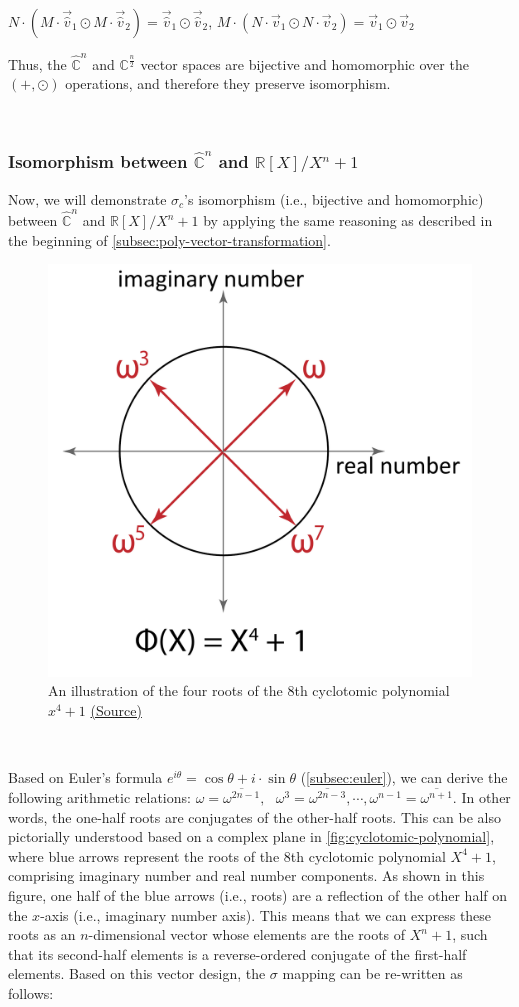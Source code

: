 $N\cdot (M\cdot\vec{\hat v}_1 \odot M\cdot\vec{\hat v}_2) = \vec{\hat v}_1 \odot \vec{\hat v}_2$, \text{ } $M\cdot (N\cdot\vec{v}_1 \odot N\cdot\vec{v}_2) = \vec{v}_1 \odot \vec{v}_2$

Thus, the $\mathbb{\hat C}^n$ and $\mathbb{C}^{\frac{n}{2}}$ vector spaces are bijective and homomorphic over the $(+, \odot)$ operations, and therefore they preserve isomorphism. 

$ $


\subsubsection{Isomorphism between $\mathbb{\hat C}^{n}$ and $\mathbb{R}[X] / X^n + 1$}
\label{subsec:poly-vector-transformation-complex-isomorphism2}


Now, we will demonstrate $\sigma_c$'s isomorphism (i.e., bijective and homomorphic) between $\mathbb{\hat C}^{n}$ and $\mathbb{R}[X] / X^n + 1$ by applying the same reasoning as described in the beginning of \autoref{subsec:poly-vector-transformation}. 

\begin{figure}[h!]
    \centering
  \includegraphics[width=0.3\linewidth]{figures/cyclotomic-polynomial.pdf}
  \caption{An illustration of the four roots of the 8th cyclotomic polynomial $x^4 + 1$ \href{https://blog.openmined.org/content/images/2020/08/roots.PNG}{(Source)}}
  \label{fig:cyclotomic-polynomial}
\end{figure}

$ $

 Based on Euler's formula $e^{i\theta} = \cos\theta + i\cdot\sin\theta$ (\autoref{subsec:euler}), we can derive the following arithmetic relations: $\omega = \overline{\omega^{2n-1}}, \text{ } \omega^3 = \overline{\omega^{2n-3}}, \cdots, \omega^{n-1} = \overline{\omega^{n+1}}$. In other words, the one-half roots are conjugates of the other-half roots. This can be also pictorially understood based on a complex plane in \autoref{fig:cyclotomic-polynomial}, where blue arrows represent the roots of the 8th cyclotomic polynomial $X^4 + 1$, comprising imaginary number and real number components. As shown in this figure, one half of the blue arrows (i.e., roots) are a reflection of the other half on the $x$-axis (i.e., imaginary number axis). This means that we can express these roots as an $n$-dimensional vector whose elements are the roots of $X^n + 1$, such that its second-half elements is a reverse-ordered conjugate of the first-half elements. Based on this vector design, the $\sigma$ mapping can be re-written as follows:

